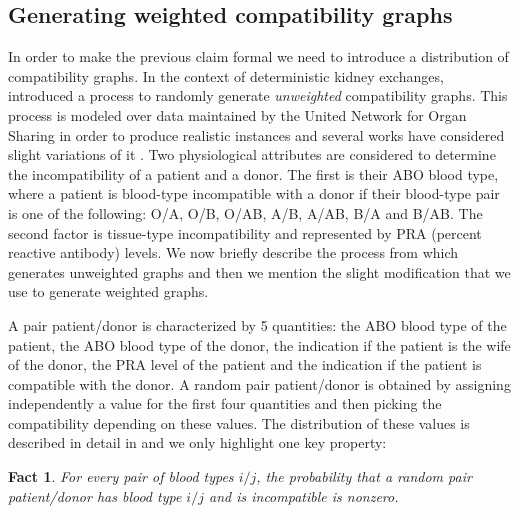 \documentclass[12pt]{article}
\newtheorem{fact}{Fact}
\begin{document}
		\subsection{Generating weighted compatibility graphs} \label{kidneyModel}
		
		In order to make the previous claim formal we need to introduce a distribution of compatibility graphs.	In the context of deterministic kidney exchanges, \cite{saidman} introduced a process to randomly generate \emph{unweighted} compatibility graphs. This process is modeled over data maintained by the United Network for Organ Sharing in order to produce realistic instances and several works have considered slight variations of it \cite{david,roth3,roth1,saidman,segev}. Two physiological attributes are considered to determine the incompatibility of a patient and a donor. The first is their ABO blood type, where a patient is blood-type incompatible with a donor if their blood-type pair is one of the following: O/A, O/B, O/AB, A/B, A/AB, B/A and B/AB. The second factor is tissue-type incompatibility and represented by PRA (percent reactive antibody) levels. We now briefly describe the process from \cite{saidman} which generates unweighted graphs and then we mention the slight modification that we use to generate weighted graphs. 
		
		A pair patient/donor is characterized by 5 quantities: the ABO blood type of the patient, the ABO blood type of the donor, the indication if the patient is the wife of the donor, the PRA level of the patient and the indication if the patient is compatible with the donor. A random pair patient/donor is obtained by assigning independently a value for the first four quantities and then picking the compatibility depending on these values. The distribution of these values is described in detail in \cite{saidman} and we only highlight one key property:
		
		\begin{fact}\label{prTypeInc}
			For every pair of blood types $i/j$, the probability that a random pair patient/donor has blood type $i/j$ and is incompatible is nonzero.
		\end{fact}
		
\end{document}
